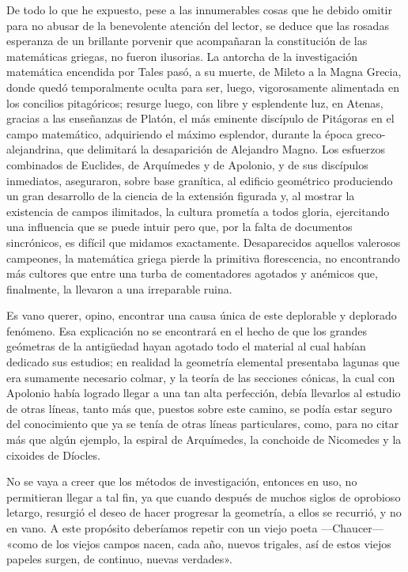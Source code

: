 \documentclass[a4paper, 12pt, draft]{article}
\begin{document}
{De todo lo que he expuesto, pese a las innumerables cosas que he debido omitir para no abusar de la benevolente atención del lector, se deduce que las rosadas esperanza de un brillante porvenir que acompañaran la constitución de las matemáticas griegas, no fueron ilusorias. La antorcha de la investigación matemática encendida por Tales pasó, a su muerte, de Mileto a la Magna Grecia, donde quedó temporalmente oculta para ser, luego, vigorosamente alimentada en los concilios pitagóricos; resurge luego, con libre y esplendente luz, en Atenas, gracias a las enseñanzas de Platón, el más eminente discípulo de Pitágoras en el campo matemático,
adquiriendo el máximo esplendor, durante la época greco-alejandrina, que delimitará la desaparición de Alejandro Magno. Los esfuerzos combinados de Euclides, de Arquímedes y de Apolonio, y de sus discípulos inmediatos, aseguraron, sobre base granítica, al edificio geométrico produciendo un gran desarrollo de la ciencia de la extensión figurada y, al mostrar la existencia de campos ilimitados, la cultura prometía a todos gloria, ejercitando una influencia que se puede intuir pero que, por la falta de documentos sincrónicos, es difícil que midamos exactamente. Desaparecidos aquellos valerosos campeones, la matemática griega pierde la primitiva florescencia, no encontrando más cultores que entre una
turba de comentadores agotados y anémicos que,
finalmente, la llevaron a una irreparable ruina.

Es vano querer, opino, encontrar una causa única de este deplorable y deplorado fenómeno. Esa
explicación no se encontrará en el hecho de que los
grandes geómetras de la antigüedad hayan agotado todo el material al cual habían dedicado sus estudios; en realidad la geometría elemental presentaba lagunas que era sumamente necesario colmar, y la teoría de las secciones cónicas, la cual con Apolonio había logrado llegar a una tan alta perfección, debía llevarlos al estudio de otras líneas, tanto más que, puestos sobre este camino, se podía estar seguro del conocimiento que ya se tenía de otras líneas particulares, como, para no citar más que algún ejemplo, la espiral de Arquímedes, la conchoide de Nicomedes y la cixoides de Díocles.

No se vaya a creer que los métodos de investigación, entonces en uso, no permitieran llegar a tal fin, ya que cuando después de muchos siglos de oprobioso letargo, resurgió el deseo de hacer progresar la geometría, a ellos se recurrió, y no en vano. A este propósito deberíamos repetir con un viejo poeta ---Chaucer--- «como de los viejos campos nacen, cada año, nuevos trigales, así de estos viejos papeles surgen, de continuo, nuevas verdades».

}
\end{document}
